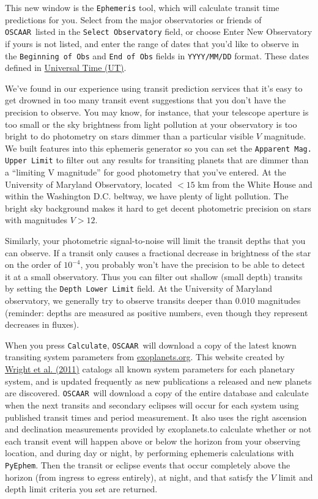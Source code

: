 \documentclass[a4paper]{article}
\newcommand{\code}[1]{\texttt{#1}}
\newcommand{\oscaar}{\code{OSCAAR}~}
\begin{document}
This new window is the \code{Ephemeris} tool, which will calculate transit time predictions for you. Select from the major observatories or friends of \oscaar listed in the \code{Select Observatory} field, or choose Enter New Observatory if yours is not listed, and enter the range of dates that you'd like to observe in the \code{Beginning of Obs} and \code{End of Obs} fields in \code{YYYY/MM/DD} format.  These dates defined in \href{http://en.wikipedia.org/wiki/Universal_time}{Universal Time (UT)}.

We've found in our experience using transit prediction services that it's easy to get drowned in too many transit event suggestions that you don't have the precision to observe. You may know, for instance, that your telescope aperture is too small or the sky brightness from light pollution at your observatory is too bright to do photometry on stars dimmer than a particular visible $V$ magnitude. We built features into this ephemeris generator so you can set the \code{Apparent Mag. Upper Limit} to filter out any results for transiting planets that are dimmer than a ``limiting V magnitude'' for good photometry that you've entered. At the University of Maryland Observatory, located $<15$ km from the White House and within the Washington D.C. beltway, we have plenty of light pollution. The bright sky background makes it hard to get decent photometric precision on stars with magnitudes $V>12$.

Similarly, your photometric signal-to-noise will limit the transit depths that you can observe. If a transit only causes a fractional decrease in brightness of the star on the order of $10^{-4}$, you probably won't have the precision to be able to detect it at a small observatory. Thus you can filter out shallow (small depth) transits by setting the \code{Depth Lower Limit} field. At the University of Maryland observatory, we generally try to observe transits deeper than 0.010 magnitudes (reminder: depths are measured as positive numbers, even though they represent decreases in fluxes).

When you press \code{Calculate}, \oscaar will download a copy of the latest known transiting system parameters from \href{http://www.exoplanets.org/}{exoplanets.org}. This website created by \href{http://adsabs.harvard.edu/abs/2011PASP..123..412W}{Wright et al. (2011)} catalogs all known system parameters for each planetary system, and is updated frequently as new publications a released and new planets are discovered. \oscaar will download a copy of the entire database and calculate when the next transits and secondary eclipses will occur for each system using published transit times and period measurement. It also uses the right ascension and declination measurements provided by exoplanets.\@org to calculate whether or not each transit event will happen above or below the horizon from your observing location, and during day or night, by performing ephemeris calculations with \code{PyEphem}. Then the transit or eclipse events that occur completely above the horizon (from ingress to egress entirely), at night, and that satisfy the $V$ limit and depth limit criteria you set are returned. 
\end{document}
